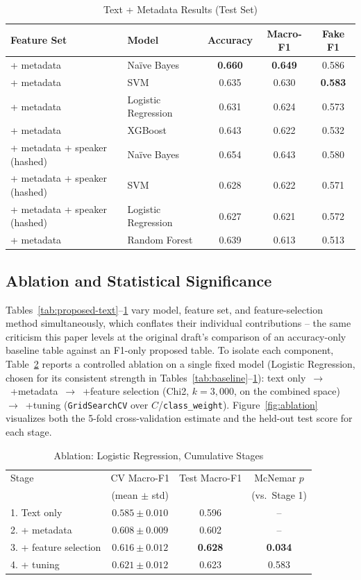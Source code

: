 \documentclass[conference]{IEEEtran}
\begin{document}
\begin{table}[!t]
\caption{Text + Metadata Results (Test Set)}
\label{tab:metadata}
\centering
\begin{tabular}{llccc}
\toprule
Feature Set & Model & Accuracy & Macro-F1 & Fake F1 \\
\midrule
+ metadata & Na\"ive Bayes & \textbf{0.660} & \textbf{0.649} & 0.586 \\
+ metadata & SVM & 0.635 & 0.630 & \textbf{0.583} \\
+ metadata & Logistic Regression & 0.631 & 0.624 & 0.573 \\
+ metadata & XGBoost & 0.643 & 0.622 & 0.532 \\
+ metadata + speaker (hashed) & Na\"ive Bayes & 0.654 & 0.643 & 0.580 \\
+ metadata + speaker (hashed) & SVM & 0.628 & 0.622 & 0.571 \\
+ metadata + speaker (hashed) & Logistic Regression & 0.627 & 0.621 & 0.572 \\
+ metadata & Random Forest & 0.639 & 0.613 & 0.513 \\
\bottomrule
\end{tabular}
\end{table}

\subsection{Ablation and Statistical Significance}
Tables~\ref{tab:proposed-text}--\ref{tab:metadata} vary model, feature set, and
feature-selection method simultaneously, which conflates their individual
contributions -- the same criticism this paper levels at the original draft's
comparison of an accuracy-only baseline table against an F1-only proposed table.
To isolate each component, Table~\ref{tab:ablation} reports a controlled ablation
on a single fixed model (Logistic Regression, chosen for its consistent strength
in Tables~\ref{tab:baseline}--\ref{tab:metadata}): text
only~$\rightarrow$~+metadata~$\rightarrow$~+feature selection (Chi2, $k=3{,}000$,
on the combined space)~$\rightarrow$~+tuning (\texttt{GridSearchCV} over
$C$/\texttt{class\_weight}). Figure~\ref{fig:ablation} visualizes both the 5-fold
cross-validation estimate and the held-out test score for each stage.

\begin{table}[!t]
\caption{Ablation: Logistic Regression, Cumulative Stages}
\label{tab:ablation}
\centering
\begin{tabular}{lccc}
\toprule
Stage & CV Macro-F1 & Test Macro-F1 & McNemar $p$ \\
      & (mean $\pm$ std) & & (vs.\ Stage 1) \\
\midrule
1. Text only & $0.585 \pm 0.010$ & 0.596 & -- \\
2. + metadata & $0.608 \pm 0.009$ & 0.602 & -- \\
3. + feature selection & $0.616 \pm 0.012$ & \textbf{0.628} & \textbf{0.034} \\
4. + tuning & $0.621 \pm 0.012$ & 0.623 & 0.583 \\
\bottomrule
\end{tabular}
\end{table}
\end{document}
